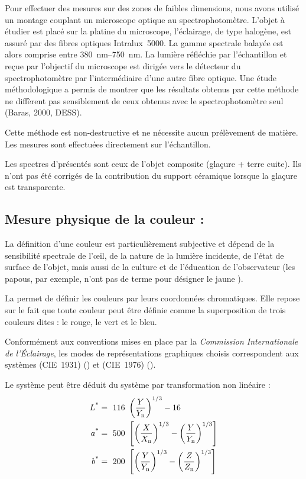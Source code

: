 Pour effectuer des mesures sur des zones de faibles dimensions, 
nous avons utilisé un montage couplant un microscope optique au 
spectrophotomètre. L'objet à étudier est placé sur la platine du 
microscope, l'éclairage, de type halogène, est assuré par des fibres 
optiques Intralux~5000. La gamme spectrale balayée est alors comprise 
entre \SIrange[range-phrase=\ et\ ]{380}{750}{\nm}. La lumière 
réfléchie par l'échantillon et reçue par l'objectif du microscope est 
dirigée vers le détecteur du spectrophotomètre par l'intermédiaire 
d'une autre fibre optique. Une étude méthodologique a permis de 
montrer que les résultats obtenus par cette méthode ne diffèrent pas 
sensiblement de ceux obtenus avec le spectrophotomètre seul (Baras, 
2000, DESS).

Cette méthode est non-destructive et ne nécessite aucun prélèvement de 
matière. Les mesures sont effectuées directement sur l'échantillon.

Les spectres d'\AO présentés sont ceux de l'objet composite (glaçure + 
terre cuite). Ils n'ont pas été corrigés de la contribution du support 
céramique lorsque la glaçure est transparente.

\subsection[Chromamétrie]{Mesure physique de la couleur : \CHRO}
La définition d'une couleur est particulièrement subjective et dépend 
de la sensibilité spectrale de l'{\oe}il, de la nature de la lumière 
incidente, de l'état de surface de l'objet, mais aussi de la culture 
et de l'éducation de l'observateur (les papous, par exemple, n'ont pas 
de terme pour désigner le jaune \autocite{couleur_2000}).

La \CHRO permet de définir les couleurs par leurs
coordonnées chromatiques. Elle repose sur le fait que toute couleur
peut être définie comme la superposition de trois couleurs dites
 : le rouge, le vert et le bleu.

Conformément aux conventions mises en place par la \emph{Commission 
Internationale de l'Éclairage}, les modes de représentations 
graphiques choisis correspondent aux systèmes \Yxy (CIE~1931) 
() et \Lab (CIE~1976) ().

Le système \Lab peut être déduit du système \Yxy par transformation 
non linéaire :
\begin{align}
  \CIEL & =\ 116\ \left(\frac{Y}{\Yn}\right)^{1/3} - 16 \\
%
  \CIEa & =\ 500\ \left[%
      \left(\frac{X}{\Xn}\right)^{1/3} - %
      \left(\frac{Y}{\Yn}\right)^{1/3}%
    \right] \\
%
  \CIEb & =\ 200\ \left[%
      \left(\frac{Y}{\Yn}\right)^{1/3} - %
      \left(\frac{Z}{\Zn}\right)^{1/3}%
    \right]
\end{align}

